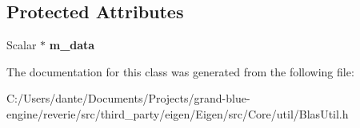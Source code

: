 \subsection*{Protected Attributes}
\begin{DoxyCompactItemize}
\item 
\mbox{\label{class_eigen_1_1internal_1_1_blas_linear_mapper_a3cea3f284f9d821a49ee33246be9bd86}} 
Scalar $\ast$ {\bfseries m\+\_\+data}
\end{DoxyCompactItemize}


The documentation for this class was generated from the following file\+:\begin{DoxyCompactItemize}
\item 
C\+:/\+Users/dante/\+Documents/\+Projects/grand-\/blue-\/engine/reverie/src/third\+\_\+party/eigen/\+Eigen/src/\+Core/util/Blas\+Util.\+h\end{DoxyCompactItemize}
